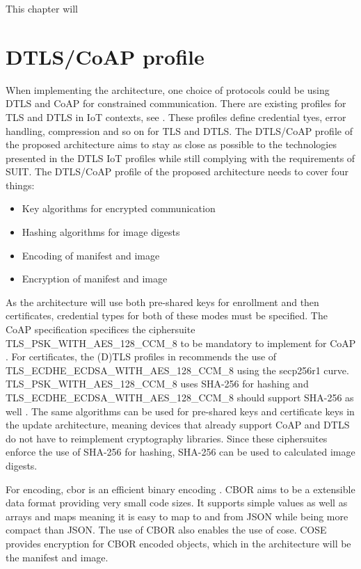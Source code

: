 \documentclass[0-thesis.tex]{subfiles}
\begin{document}
\label{chap:profiles}
This chapter will 

\section{DTLS/CoAP profile}
\label{sec:dtls-coap-profile}
When implementing the architecture, one choice of protocols could be using DTLS and CoAP
for constrained communication. There are existing profiles for TLS and DTLS in IoT
contexts, see \parencite{rfc7925}. These profiles define credential tyes, error
handling, compression and so on for TLS and DTLS. The DTLS/CoAP profile of the proposed
architecture aims to stay as close as possible to the technologies presented in the DTLS
IoT profiles while still complying with the requirements of SUIT. The DTLS/CoAP profile of
the proposed architecture needs to cover four things:

\begin{itemize}
    \item Key algorithms for encrypted communication
    \item Hashing algorithms for image digests
    \item Encoding of manifest and image
    \item Encryption of manifest and image
\end{itemize}

As the architecture will use both pre-shared keys for enrollment and then certificates,
credential types for both of these modes must be specified. The CoAP specification
specifices the ciphersuite TLS\_PSK\_WITH\_AES\_128\_CCM\_8{} to be mandatory to implement
for CoAP \parencite{rfc7252}. For certificates, the (D)TLS profiles in \parencite{rfc7925}
recommends the use of TLS\_ECDHE\_ECDSA\_WITH\_AES\_128\_CCM\_8{} using the secp256r1
curve. TLS\_PSK\_WITH\_AES\_128\_CCM\_8{} uses SHA-256 for hashing and
TLS\_ECDHE\_ECDSA\_WITH\_AES\_128\_CCM\_8{} should support SHA-256 as well \parencite{rfc7251}.
The same algorithms can be used for pre-shared keys and certificate keys in the update
architecture, meaning devices that already support CoAP and DTLS do not have to
reimplement cryptography libraries. Since these ciphersuites enforce the use of SHA-256
for hashing, SHA-256 can be used to calculated image digests.

For encoding, \gls{cbor} is an efficient binary encoding \parencite{rfc7049}. CBOR aims to
be a extensible data format providing very small code sizes. It supports simple values as
well as arrays and maps meaning it is easy to map to and from JSON while being more
compact than JSON. The use of CBOR also enables the use of \gls{cose}. COSE provides
encryption for CBOR encoded objects, which in the architecture will be the manifest and
image.




\end{document}
